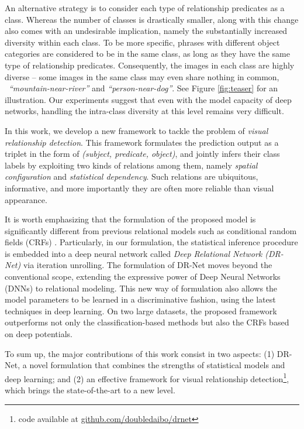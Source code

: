 \documentclass[10pt,twocolumn,letterpaper]{article}
\begin{document}
An alternative strategy is to consider each type of relationship predicates
as a class. Whereas the number of classes is drastically smaller,
along with this change also comes with an undesirable 
implication, namely the substantially increased diversity within each class.
To be more specific, phrases with different object categories
are considered to be in the same class, as long as they have 
the same type of relationship predicates.
Consequently, the images in each class are highly diverse --
some images in the same class may even share nothing in common,
\eg~\emph{``mountain-near-river''} and \emph{``person-near-dog''}.
See Figure \ref{fig:teaser} for an illustration.
Our experiments suggest that even with the model capacity of deep networks,
handling the intra-class diversity at this level remains very difficult.

In this work, we develop a new framework to tackle the problem 
of \emph{visual relationship detection}.
This framework formulates the prediction output as a triplet
in the form of \emph{(subject, predicate, object)}, and
jointly infers their class labels by exploiting 
two kinds of relations among them, namely
\emph{spatial configuration} and \emph{statistical dependency}.
Such relations are ubiquitous, informative, and more importantly
they are often more reliable than visual appearance.

It is worth emphasizing that the formulation of the proposed model
is significantly different from previous relational models such as
conditional random fields (CRFs) \cite{lafferty2001conditional}. 
Particularly, in our formulation, the statistical inference procedure
is embedded into a deep neural network 
called \emph{Deep Relational Network (DR-Net)} via iteration unrolling.
The formulation of DR-Net moves beyond the conventional scope, extending
the expressive power of Deep Neural Networks (DNNs) to relational modeling.
This new way of formulation also allows the model parameters to be learned 
in a discriminative fashion, using the latest techniques in deep learning.  
On two large datasets, the proposed framework outperforms not only 
the classification-based methods but also the CRFs based on deep potentials.

To sum up, the major contributions of this work consist in two aspects:
(1) DR-Net, a novel formulation that combines the strengths of statistical
models and deep learning; and
(2) an effective framework for visual relationship detection\footnote{code available at \url{github.com/doubledaibo/drnet}}, 
which brings the state-of-the-art to a new level.
\end{document}
